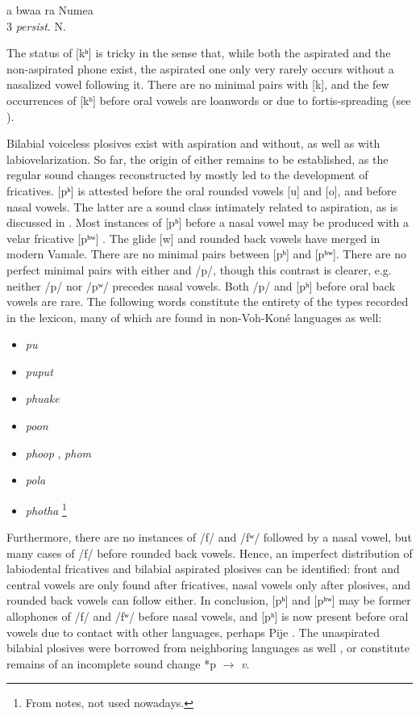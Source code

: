 	
	\ea	
	\gll a bwaa ra Numea\\	
	 3  \textit{persist}. N.\\
		\glt {}	
	\z
	
The status of [kʰ] is tricky in the sense that, while both the aspirated and the non-aspirated phone exist, the aspirated one only very rarely occurs without a nasalized vowel following it. There are no minimal pairs with [k], and the few occurrences of [kʰ] before oral vowels are loanwords or due to fortis-spreading (see ). 

Bilabial voiceless plosives exist with aspiration and without, as well as with labiovelarization. So far, the origin of either remains to be established, as the regular sound changes reconstructed by \citeauthor{ozanne-rivierre_structural_1995} mostly led to the development of fricatives. [pʰ] is attested before the oral rounded vowels [u] and [o], and before nasal vowels. The latter are a sound class intimately related to aspiration, as is discussed in . Most instances of [pʰ] before a nasal vowel may be produced with a velar fricative [pʰʷ] \goodtilde [pχ]. The glide [w] and rounded back vowels have merged in modern Vamale. There are no minimal pairs between [pʰ] and [pʰʷ]. There are no perfect minimal pairs with either and /p/, though this contrast is clearer, e.g. neither /p/ nor /pʷ/ precedes nasal vowels. Both /p/ and [pʰ] before oral back vowels are rare. The following words constitute the entirety of the types recorded in the lexicon, many of which are found in non-Voh-Koné languages as well: \begin{itemize}
\item \textit{pu}  \item \textit{puput}  \item \textit{phuake}  \item  \textit{poon}  \item \textit{phoop} , \textit{phom}  \item \textit{pola}  \item \textit{photha} \footnote{From  notes, not used nowadays.} 
\end{itemize}
Furthermore, there are no instances of /f/ and /fʷ/ followed by a nasal vowel, but many cases of /f/ before rounded back vowels. Hence, an imperfect distribution of labiodental fricatives and bilabial aspirated plosives can be identified: front and central vowels are only found after fricatives, nasal vowels only after plosives, and rounded back vowels can follow either. In conclusion, [pʰ] and [pʰʷ] may be former allophones of /f/ and /fʷ/ before nasal vowels, and [pʰ] is now present before oral vowels due to contact with other languages, perhaps Pije \parencite[518]{rivierre_contact_1994}. The unaspirated bilabial plosives were borrowed from neighboring languages as well \parencite[516]{rivierre_contact_1994}, or constitute remains of an incomplete sound change *p $\rightarrow$ \textit{v}. 
